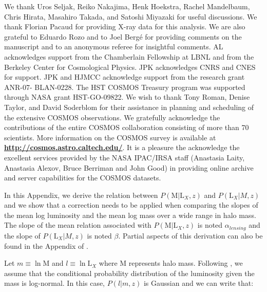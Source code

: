 \documentclass[12pt]{emulateapj}
\begin{document}

\acknowledgments
{}

We thank Uros Seljak, Reiko Nakajima, Henk Hoekstra, Rachel
Mandelbaum, Chris Hirata, Masahiro Takada, and Satoshi Miyazaki for
useful discussions. We thank Florian Pacaud for providing X-ray data
for this analysis. We are also grateful to Eduardo Rozo and to Joel
Berg\'{e} for providing comments on the manuscript and to an anonymous
referee for insightful comments. AL acknowledges support from the
Chamberlain Fellowship at LBNL and from the Berkeley Center for
Cosmological Physics. JPK acknowledges CNRS and CNES for support. JPK
and HJMCC acknowledge support from the research grant ANR-07-
BLAN-0228. The HST COSMOS Treasury program was supported through NASA
grant HST-GO-09822. We wish to thank Tony Roman, Denise Taylor, and
David Soderblom for their assistance in planning and scheduling of the
extensive COSMOS observations.  We gratefully acknowledge the
contributions of the entire COSMOS collaboration consisting of more
than 70 scientists.  More information on the COSMOS survey is
available at {\bf \url{http://cosmos.astro.caltech.edu/}}. It is a
pleasure the acknowledge the excellent services provided by the NASA
IPAC/IRSA staff (Anastasia Laity, Anastasia Alexov, Bruce Berriman and
John Good) in providing online archive and server capabilities for the
COSMOS datasets.



\appendix

In this Appendix, we derive the relation between
$P(\mathrm{M}|\mathrm{L}_X,z)$ and $P(\mathrm{L}_X|M,z)$ and we show
that a correction needs to be applied when comparing the slopes of the
mean log luminosity and the mean log mass over a wide range in halo
mass. The slope of the mean relation associated with
$P(\mathrm{M}|\mathrm{L}_X,z)$ is noted $\alpha_{lensing}$ and the
slope of $P(\mathrm{L}_X|M,z)$ is noted $\beta$. Partial aspects of
this derivation can also be found in the Appendix of
\citet[][]{Mandelbaum:2007}.

Let $m \equiv \ln \mathrm{M}$ and $l\equiv \ln \mathrm{L}_{X}$ where M
represents halo mass. Following \citet[][]{Stanek:2006}, we assume
that the conditional probability distribution of the luminosity given
the mass is log-normal. In this case, $P(l|m,z)$ is Gaussian and we
can write that:
\end{document}
